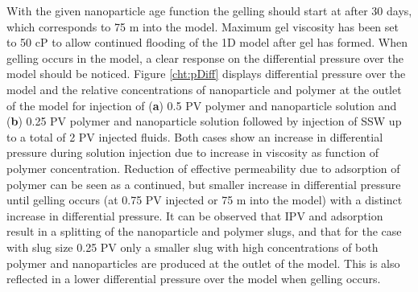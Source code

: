 \documentclass[nanomaterials,article,submit,moreauthors,pdftex]{Definitions/mdpi}
\begin{document}
With the given nanoparticle age function the gelling should start at after 30 days, which corresponds to 75 m into the model. Maximum gel viscosity has been set to 50 cP to allow continued flooding of the 1D model after gel has formed. When gelling occurs in the model, a clear response on the differential pressure over the model should be noticed. Figure \ref{cht:pDiff} displays differential pressure over the model and the relative concentrations of nanoparticle and polymer at the outlet of the model for injection of (\textbf{a}) 0.5 PV polymer and nanoparticle solution and (\textbf{b}) 0.25 PV polymer and nanoparticle solution followed by injection of SSW up to a total of 2 PV injected fluids. Both cases show an increase in differential pressure during solution injection due to increase in viscosity as function of polymer concentration. Reduction of effective permeability due to adsorption of polymer can be seen as a continued, but smaller increase in differential pressure until gelling occurs (at 0.75 PV injected or 75 m into the model) with a distinct increase in differential pressure. It can be observed that IPV and adsorption result in a splitting of the nanoparticle and polymer slugs, and that for the case with slug size 0.25 PV only a smaller slug with high concentrations of both polymer and nanoparticles are produced at the outlet of the model. This is also reflected in a lower differential pressure over the model when gelling occurs. 
\end{document}

